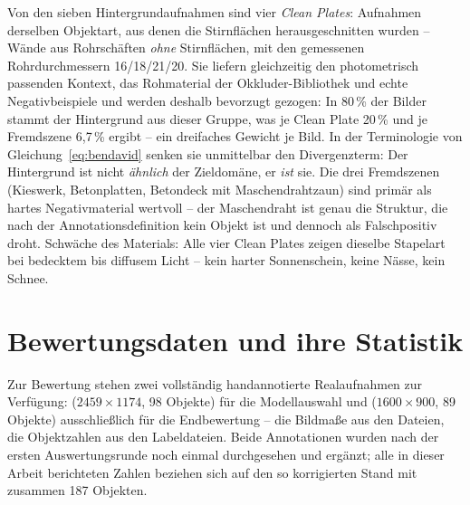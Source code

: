  Von den sieben Hintergrundaufnahmen sind vier
\emph{Clean Plates}: Aufnahmen derselben Objektart, aus denen die Stirnflächen
herausgeschnitten wurden -- Wände aus Rohrschäften \emph{ohne} Stirnflächen, mit
den gemessenen Rohrdurchmessern 16/18/21/20\px{}. Sie liefern gleichzeitig den
photometrisch passenden Kontext, das Rohmaterial der Okkluder-Bibliothek und
echte Negativbeispiele und werden deshalb bevorzugt gezogen: In 80\,\% der
Bilder stammt der Hintergrund aus dieser Gruppe, was je Clean Plate 20\,\% und
je Fremdszene 6,7\,\% ergibt -- ein dreifaches Gewicht je Bild. In der
Terminologie von Gleichung~\eqref{eq:bendavid} senken sie unmittelbar den
Divergenzterm: Der Hintergrund ist nicht \emph{ähnlich} der Zieldomäne, er
\emph{ist} sie. Die drei Fremdszenen (Kieswerk, Betonplatten, Betondeck mit
Maschendrahtzaun) sind primär als hartes Negativmaterial wertvoll -- der
Maschendraht ist genau die Struktur, die nach der Annotationsdefinition kein
Objekt ist und dennoch als Falschpositiv droht. Schwäche des Materials: Alle vier
Clean Plates zeigen dieselbe Stapelart bei bedecktem bis diffusem Licht -- kein
harter Sonnenschein, keine Nässe, kein Schnee.

\section{Bewertungsdaten und ihre Statistik}
\label{sec:valtest}

Zur Bewertung stehen zwei vollständig handannotierte Realaufnahmen zur
Verfügung:  ($2459\times1174$, 98 Objekte) für die Modellauswahl und
 ($1600\times900$, 89 Objekte) ausschließlich für die Endbewertung --
die Bildmaße aus den Dateien, die Objektzahlen aus den Labeldateien.
Beide Annotationen wurden nach der ersten Auswertungsrunde noch einmal
durchgesehen und ergänzt; alle in dieser Arbeit berichteten Zahlen beziehen sich
auf den so korrigierten Stand mit zusammen 187 Objekten.

